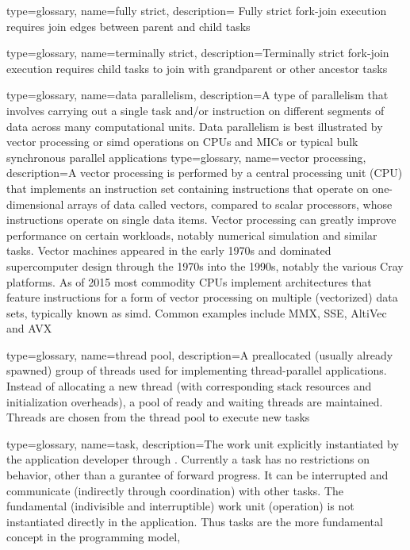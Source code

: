 {
  type=glossary,
  name={fully strict},
  description={ Fully strict \gls{fork-join} execution requires join edges between parent and
    child tasks} 
}

{
  type=glossary,
  name={terminally strict},
  description={Terminally strict \gls{fork-join} execution requires child tasks to join with
    grandparent or other ancestor tasks}
}

{
  type=glossary,
  name={data parallelism},
  description={A type of parallelism that involves carrying out a single task
    and/or instruction on different segments of data across many computational
      units. Data parallelism is best illustrated by \gls{vector processing} or \gls{simd} operations on
      \glspl{CPU} and \glspl{MIC} or typical \gls{bulk synchronous} parallel applications}
}
{
  type=glossary,
  name={vector processing},
  description={A vector processing is performed by a central
  processing unit (\gls{CPU}) that implements an instruction set containing
  instructions that operate on one-dimensional arrays of data called
  vectors, compared to scalar processors, whose instructions operate
  on single data items. Vector processing can greatly improve
  performance on certain workloads, notably numerical simulation and
  similar tasks. Vector machines appeared in the early 1970s and
  dominated supercomputer design through the 1970s into the 1990s,
  notably the various Cray platforms. As of 2015 most commodity \glspl{CPU}
  implement architectures that feature instructions for a form of
  vector processing on multiple (vectorized) data sets, typically
  known as \gls{simd}. Common examples include MMX, \gls{SSE},
  AltiVec and \gls{AVX}}
}

{
  type=glossary,
  name={thread pool},
  description={A preallocated (usually already spawned) group of threads used for implementing thread-parallel applications.
  Instead of allocating a new thread (with corresponding stack resources and initialization overheads),
  a pool of ready and waiting threads are maintained.
  Threads are chosen from the thread pool to execute new tasks}
}

{
  type=glossary,
  name={task},
  description={The work unit explicitly instantiated by the application developer through .
  Currently a task has no restrictions on behavior, other than a gurantee of forward progress.
  It can be interrupted and communicate (indirectly through coordination) with other tasks.
  The fundamental (indivisible and interruptible) work unit (\gls{operation}) is not instantiated directly
  in the application. Thus tasks are the more fundamental concept in the programming model},
}

